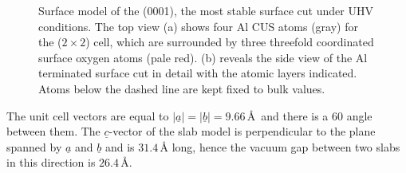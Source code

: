 \documentclass[11pt,DIV=13,BCOR=5mm,a4paper,headinclude]{scrbook}
\renewcommand{\vec}[1]{\underline{#1}}
\begin{document}
\begin{figure}[!ht]
 \centering
{}
 \quad\quad
 \caption{Surface model of the (0001), the most stable surface cut under UHV conditions.
The top view (a) shows four Al CUS atoms (gray) for the ($2\times 2$) cell, which are surrounded by three threefold coordinated surface oxygen atoms (pale red).
(b) reveals the side view of the Al terminated surface cut in detail with the atomic layers indicated.
Atoms below the dashed line are kept fixed to bulk values.}
        \label{abb:surf_0001}
\end{figure}
The unit cell vectors are equal to $|\vec{a}|=|\vec{b}|=9.66\,$\AA  ~and there is a $60$\textdegree{} angle between them.
The $\vec{c}$-vector of the slab model is perpendicular to the plane spanned by $\vec{a}$ and $\vec{b}$ and is $31.4\,$\AA{} long, hence the vacuum gap between two slabs in this direction is $26.4\,$\AA.
\end{document}
